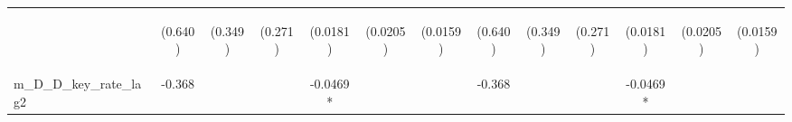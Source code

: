 \documentclass[]{article}
\begin{document}
\begin{center}
\begin{tabular}{lcccccccccccc}
\vspace{4pt} & \begin{footnotesize}(0.640)\end{footnotesize} & \begin{footnotesize}(0.349)\end{footnotesize} & \begin{footnotesize}(0.271)\end{footnotesize} & \begin{footnotesize}(0.0181)\end{footnotesize} & \begin{footnotesize}(0.0205)\end{footnotesize} & \begin{footnotesize}(0.0159)\end{footnotesize} & \begin{footnotesize}(0.640)\end{footnotesize} & \begin{footnotesize}(0.349)\end{footnotesize} & \begin{footnotesize}(0.271)\end{footnotesize} & \begin{footnotesize}(0.0181)\end{footnotesize} & \begin{footnotesize}(0.0205)\end{footnotesize} & \begin{footnotesize}(0.0159)\end{footnotesize} \\
m\_D\_D\_key\_rate\_lag2 & -0.368 &  &  & -0.0469* &  &  & -0.368 &  &  & -0.0469* &  &  \\

\end{tabular}
\end{center}
\end{document}
